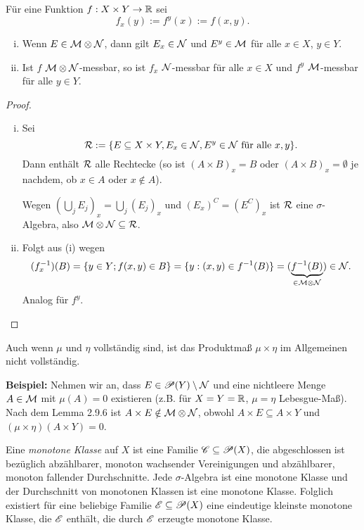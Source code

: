 Für eine Funktion $f: X \times Y \to \mathbb{R}$ sei
\[ f_x(y) := f^y(x) := f(x,y). \]

\begin{lem}
 \begin{enumerate}[(i)]
  \item Wenn $E \in \mathcal{M} \otimes \mathcal{N}$, dann gilt $E_x \in \mathcal{N}$ und $E^y \in \mathcal{M}$ für alle $x \in X$, $y \in Y$.
  \item Ist $f$ $\mathcal{M} \otimes \mathcal{N}$-messbar, so ist $f_x$ $\mathcal{N}$-messbar für alle $x \in X$ und $f^y$ $\mathcal{M}$-messbar für alle $y \in Y$.
 \end{enumerate}
\end{lem}

\begin{proof}
 \begin{enumerate}[(i)]
  \item Sei 
   \[ \mathcal{R} := \{ E \subseteq X \times Y, E_x \in \mathcal{N}, E^y \in \mathcal{N} \text{ für alle } x,y \}. \]
   Dann enthält $\mathcal{R}$ alle Rechtecke (so ist $(A \times B)_x = B$ oder $(A \times B)_x = \emptyset$ je nachdem, ob $x \in A$ oder $x \notin A$).
   
   Wegen $(\bigcup_j E_j)_x = \bigcup_j (E_j)_x$ und $(E_x)^C = (E^C)_x$ ist $\mathcal{R}$ eine $\sigma$-Algebra, also $\mathcal{M} \otimes \mathcal{N} \subseteq \mathcal{R}$.
  \item Folgt aus (i) wegen
   \[ (f_x^{-1})(B) = \{ y \in Y; f(x,y) \in B \} = \{ y: (x,y) \in f^{-1}(B) \} = (\underbrace{f^{-1}(B)}_{\in \mathcal{M} \otimes \mathcal{N}}) \in \mathcal{N}. \]
   Analog für $f^y$. \qedhere
 \end{enumerate}
\end{proof}

\begin{rmrk}
 Auch wenn $\mu$ und $\eta$ vollständig sind, ist das Produktmaß $\mu \times \eta$ im Allgemeinen nicht vollständig.
 
 \textbf{Beispiel:} Nehmen wir an, dass $E \in \mathscr{P}(Y) \setminus \mathcal{N}$ und eine nichtleere Menge $A \in \mathcal{M}$ mit $\mu(A) = 0$ existieren (z.B. für $X=Y=\mathbb{R}$, $\mu = \eta$ Lebesgue-Maß). Nach dem Lemma 2.9.6 ist $A \times E \notin \mathcal{M} \otimes \mathcal{N}$, obwohl $A \times E \subseteq A \times Y$ und $(\mu \times \eta)(A \times Y) = 0$.
\end{rmrk}

\begin{defn}
 Eine \emph{monotone Klasse} auf $X$ ist eine Familie $\mathscr{C} \subseteq \mathscr{P}(X)$, die abgeschlossen ist bezüglich abzählbarer, monoton wachsender Vereinigungen und abzählbarer, monoton fallender Durchschnitte. Jede $\sigma$-Algebra ist eine monotone Klasse und der Durchschnitt von monotonen Klassen ist eine monotone Klasse. Folglich existiert für eine beliebige Familie $\mathscr{E} \subseteq \mathscr{P}(X)$ eine eindeutige kleinste monotone Klasse, die $\mathscr{E}$ enthält, die durch $\mathscr{E}$ erzeugte monotone Klasse.
\end{defn}

